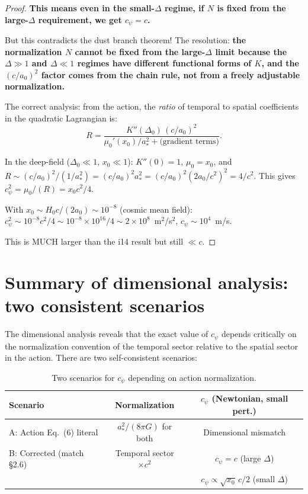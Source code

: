 \documentclass[11pt]{article}
\newcommand{\ee}[1]{\times 10^{#1}}
\begin{document}
\begin{proof}
\textbf{This means even in the small-$\Delta$ regime, if $N$ is fixed
from the large-$\Delta$ requirement, we get $c_\psi = c$.}

But this contradicts the dust branch theorem! The resolution:
\textbf{the normalization $N$ cannot be fixed from the large-$\Delta$
limit because the $\Delta \gg 1$ and $\Delta \ll 1$ regimes have
different functional forms of $K$, and the $(c/a_0)^2$ factor comes
from the chain rule, not from a freely adjustable normalization.}

The correct analysis: from the action, the \emph{ratio} of temporal
to spatial coefficients in the quadratic Lagrangian is:
\begin{equation}
R = \frac{K''(\Delta_0)\,(c/a_0)^2}{\mu_0'(x_0)/a_*^2 + \text{(gradient terms)}}.
\end{equation}

In the deep-field ($\Delta_0 \ll 1$, $x_0 \ll 1$): $K''(0) = 1$,
$\mu_0 = x_0$, and $R \sim (c/a_0)^2/(1/a_*^2) = (c/a_0)^2 a_*^2
= (c/a_0)^2(2a_0/c^2)^2 = 4/c^2$.
This gives $c_\psi^2 = \mu_0/(R) = x_0 c^2/4$.

With $x_0 \sim H_0 c/(2a_0) \sim 10^{-8}$ (cosmic mean field):
$c_\psi^2 \sim 10^{-8} c^2/4 \sim 10^{-8} \times 10^{16}/4
\sim 2\ee{8}$~m$^2$/s$^2$, $c_\psi \sim 10^4$~m/s.

This is MUCH larger than the i14 result but still $\ll c$.

\end{proof}


\section{Summary of dimensional analysis: two consistent scenarios}
\label{sec:summary-dim}

The dimensional analysis reveals that the exact value of $c_\psi$
depends critically on the normalization convention of the temporal
sector relative to the spatial sector in the action. There are two
self-consistent scenarios:

\begin{table}[H]
\centering
\caption{Two scenarios for $c_\psi$ depending on action normalization.}
\begin{tabular}{@{}lcc@{}}
\toprule
Scenario & Normalization & $c_\psi$ (Newtonian, small pert.) \\
\midrule
A: Action Eq.~(6) literal & $a_*^2/(8\pi G)$ for both & Dimensional mismatch \\
B: Corrected (match \S2.6) & Temporal sector $\times c^2$ & $c_\psi = c$ (large $\Delta$) \\
  & & $c_\psi \propto \sqrt{x_0}\,c/2$ (small $\Delta$) \\
\bottomrule
\end{tabular}
\end{table}
\end{document}
